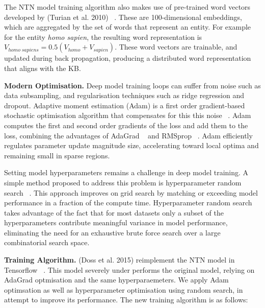 The NTN model training algorithm also makes use of pre-trained word vectors developed by (Turian et al. 2010) ~\citep{turian2010word}. These are 100-dimensional embeddings, which are aggregated by the set of words that represent an entity. For example for the entity \textit{homo sapien}, the resulting word representation is $V_{homo \; sapiens} = 0.5(V_{homo} + V_{sapien})$. These word vectors are trainable, and updated during back propagation, producing a distributed word representation that aligns with the KB. \newpage

\textbf{Modern Optimisation.} Deep model training loops can suffer from noise such as data subsampling, and regularisation techniques such as ridge regression and dropout. Adaptive moment estimation (Adam) is a first order gradient-based stochastic optimisation algorithm that compensates for this this noise ~\citep{kingma2014adam}. Adam computes the first and second order gradients of the loss and add them to the loss, combining the advantages of AdaGrad ~\citep{duchi2011adaptive} and RMSprop ~\citep{tieleman2012lecture}. Adam efficiently regulates parameter update magnitude size, accelerating toward local optima and remaining small in sparse regions. \bigskip

Setting model hyperparameters remains a challenge in deep model training. A simple method proposed to address this problem is hyperparameter random search ~\citep{bergstra2012random}. This approach improves on grid search by matching or exceeding model performance in a fraction of the compute time. Hyperparameter random search takes advantage of the fact that for most datasets only a subset of the hyperparameters contribute meaningful variance in model performance, eliminating the need for an exhaustive brute force search over a large combinatorial search space. \bigskip

\textbf{Training Algorithm.} (Doss et al. 2015) reimplement the NTN model in Tensorflow ~\citep{abadi2016tensorflow}. This model severely under performs the original model, relying on AdaGrad optmisation and the same hyperparaemeters. We apply Adam optimsation as well as hyperparameter optimisation using random search, in attempt to improve its performance. The new training algorithm is as follows: \bigbreak

